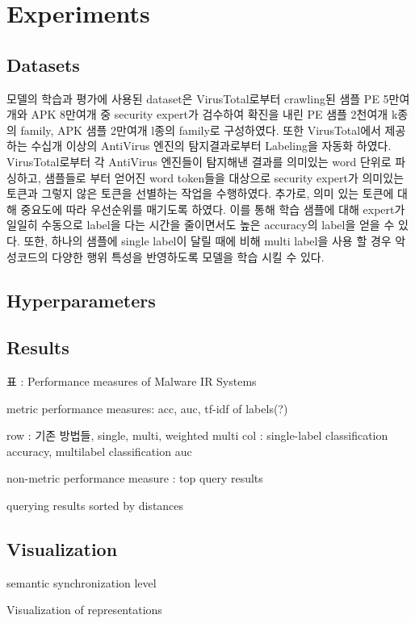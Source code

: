 \section{Experiments}

\subsection{Datasets}
모델의 학습과 평가에 사용된 dataset은 VirusTotal로부터 crawling된 샘플 PE 5만여개와 APK 8만여개 중 security expert가 검수하여 확진을 내린 PE 샘플 2천여개 k종의 family, APK 샘플 2만여개 l종의 family로 구성하였다.
또한 VirusTotal에서 제공하는 수십개 이상의 AntiVirus 엔진의 탐지결과로부터 Labeling을 자동화 하였다. VirusTotal로부터 각 AntiVirus 엔진들이 탐지해낸 결과를 의미있는 word 단위로 파싱하고, 샘플들로 부터 얻어진 word token들을 대상으로 security expert가 의미있는 토큰과 그렇지 않은 토큰을 선별하는 작업을 수행하였다. 추가로, 의미 있는 토큰에 대해 중요도에 따라 우선순위를 매기도록 하였다. 이를 통해 학습 샘플에 대해 expert가 일일히 수동으로 label을 다는 시간을 줄이면서도 높은 accuracy의 label을 얻을 수 있다. 또한, 하나의 샘플에 single label이 달릴 때에 비해 multi label을 사용 할 경우 악성코드의 다양한 행위 특성을 반영하도록 모델을 학습 시킬 수 있다. 


\subsection{Hyperparameters}


\subsection{Results}

표 : Performance measures of Malware IR Systems

metric performance measures: acc, auc, tf-idf of labels(?)

row : 기존 방법들, single, multi, weighted multi
col : single-label classification accuracy, multilabel classification auc

non-metric performance measure : top query results

querying results sorted by distances

\subsection{Visualization}

semantic synchronization level

Visualization of representations





